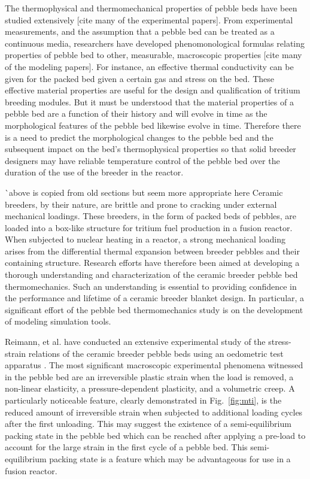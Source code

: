 The thermophysical and thermomechanical properties of pebble beds have been studied extensively [cite many of the experimental papers]. From experimental measurements, and the assumption that a pebble bed can be treated as a continuous media, researchers have developed phenomonological formulas relating properties of pebble bed to other, measurable, macroscopic properties [cite many of the modeling papers]. For instance, an effective thermal conductivity can be given for the packed bed given a certain gas and stress on the bed. These effective material properties are useful for the design and qualification of tritium breeding modules. But it must be understood that the material properties of a pebble bed are a function of their history and will evolve in time as the morphological features of the pebble bed likewise evolve in time. Therefore there is a need to predict the morphological changes to the pebble bed and the subsequent impact on the bed's thermophysical properties so that solid breeder designers may have reliable temperature control of the pebble bed over the duration of the use of the breeder in the reactor. 

^^ above is copied from old sections but seem more appropriate here
Ceramic breeders, by their nature, are brittle and prone to cracking under external mechanical loadings. These breeders, in the form of packed beds of pebbles, are loaded into a box-like structure for tritium fuel production in a fusion reactor. When subjected to nuclear heating in a reactor, a strong mechanical loading arises from the differential thermal expansion between breeder pebbles and their containing structure. Research efforts have therefore been aimed at developing a thorough understanding and characterization of the ceramic breeder pebble bed thermomechanics. Such an understanding is essential to providing confidence in the performance and lifetime of a ceramic breeder blanket design. In particular, a significant effort of the pebble bed thermomechanics study is on the development of modeling simulation tools. 

Reimann, et al. have conducted an extensive experimental study of the stress-strain relations of the ceramic breeder pebble beds using an oedometric test apparatus \cite{Piazza2002811,Reimann:2002kl,Reimann:2003qc,Reimann:2002mi,Reimann:2001il}. The most significant macroscopic experimental phenomena witnessed in the pebble bed are an irreversible plastic strain when the load is removed, a non-linear elasticity, a pressure-dependent plasticity, and a volumetric creep.  A particularly noticeable feature, clearly demonstrated in Fig.~\ref{fig:mti}, is the reduced amount of irreversible strain when subjected to additional loading cycles after the first unloading. This may suggest the existence of a semi-equilibrium packing state in the pebble bed which can be reached after applying a pre-load to account for the large strain in the first cycle of a pebble bed. This semi-equilibrium packing state is a feature which may be advantageous for use in a fusion reactor. 

